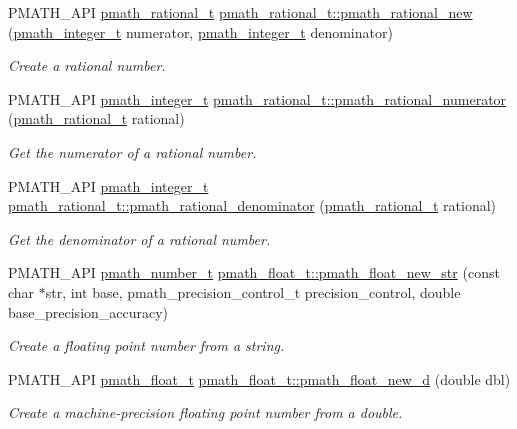 \begin{CompactItemize}
PMATH\_\-API \hyperlink{classpmath__rational__t}{pmath\_\-rational\_\-t} \hyperlink{group__numbers_g142d493a889a7d94bafe79025b61d220}{pmath\_\-rational\_\-t::pmath\_\-rational\_\-new} (\hyperlink{classpmath__integer__t}{pmath\_\-integer\_\-t} numerator, \hyperlink{classpmath__integer__t}{pmath\_\-integer\_\-t} denominator)
\begin{CompactList}\small\item\em Create a rational number. \item\end{CompactList}\item 
PMATH\_\-API \hyperlink{classpmath__integer__t}{pmath\_\-integer\_\-t} \hyperlink{group__numbers_gab6f926fcf84e9cf62c0d99699e491bf}{pmath\_\-rational\_\-t::pmath\_\-rational\_\-numerator} (\hyperlink{classpmath__rational__t}{pmath\_\-rational\_\-t} rational)
\begin{CompactList}\small\item\em Get the numerator of a rational number. \item\end{CompactList}\item 
PMATH\_\-API \hyperlink{classpmath__integer__t}{pmath\_\-integer\_\-t} \hyperlink{group__numbers_ga3f1718d2252ebce77bed83df7223f4c}{pmath\_\-rational\_\-t::pmath\_\-rational\_\-denominator} (\hyperlink{classpmath__rational__t}{pmath\_\-rational\_\-t} rational)
\begin{CompactList}\small\item\em Get the denominator of a rational number. \item\end{CompactList}\item 
PMATH\_\-API \hyperlink{classpmath__number__t}{pmath\_\-number\_\-t} \hyperlink{group__numbers_g6c67d61f1a57084cc46e858a307ec461}{pmath\_\-float\_\-t::pmath\_\-float\_\-new\_\-str} (const char $\ast$str, int base, pmath\_\-precision\_\-control\_\-t precision\_\-control, double base\_\-precision\_\-accuracy)
\begin{CompactList}\small\item\em Create a floating point number from a string. \item\end{CompactList}\item 
PMATH\_\-API \hyperlink{classpmath__float__t}{pmath\_\-float\_\-t} \hyperlink{group__numbers_g5c3beb5316feb510ee46f72f11b49117}{pmath\_\-float\_\-t::pmath\_\-float\_\-new\_\-d} (double dbl)
\begin{CompactList}\small\item\em Create a machine-precision floating point number from a double. \item\end{CompactList}\item 

\end{CompactItemize}

